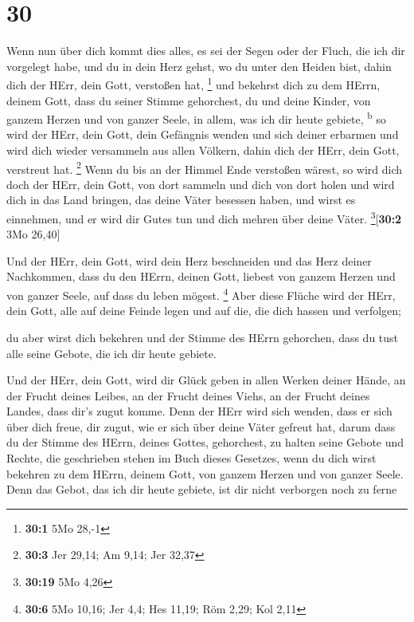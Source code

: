 \hypertarget{section-29}{%
\section{30}\label{section-29}}

 Wenn nun über dich kommt dies alles, es sei der Segen
oder der Fluch, die ich dir vorgelegt habe, und du in dein Herz gehst,
wo du unter den Heiden bist, dahin dich der HErr, dein Gott, verstoßen
hat, \footnote{\textbf{30:1} 5Mo 28,-1}  und bekehrst dich
zu dem HErrn, deinem Gott, dass du seiner Stimme gehorchest, du und
deine Kinder, von ganzem Herzen und von ganzer Seele, in allem, was ich
dir heute gebiete, \textsuperscript{b}  so wird der HErr,
dein Gott, dein Gefängnis wenden und sich deiner erbarmen und wird dich
wieder versammeln aus allen Völkern, dahin dich der HErr, dein Gott,
verstreut hat. \footnote{\textbf{30:3} Jer 29,14; Am 9,14; Jer 32,37}
 Wenn du bis an der Himmel Ende verstoßen wärest, so wird
dich doch der HErr, dein Gott, von dort sammeln und dich von dort holen
 und wird dich in das Land bringen, das deine Väter
besessen haben, und wirst es einnehmen, und er wird dir Gutes tun und
dich mehren über deine Väter. \footnote{\textbf{30:19} 5Mo 4,26}{[}\textbf{30:2}
3Mo 26,40{]}

 Und der HErr, dein Gott, wird dein Herz beschneiden und
das Herz deiner Nachkommen, dass du den HErrn, deinen Gott, liebest von
ganzem Herzen und von ganzer Seele, auf dass du leben mögest.
\footnote{\textbf{30:6} 5Mo 10,16; Jer 4,4; Hes 11,19; Röm 2,29; Kol
  2,11}  Aber diese Flüche wird der HErr, dein Gott, alle
auf deine Feinde legen und auf die, die dich hassen und verfolgen;

 du aber wirst dich bekehren und der Stimme des HErrn
gehorchen, dass du tust alle seine Gebote, die ich dir heute gebiete.

 Und der HErr, dein Gott, wird dir Glück geben in allen
Werken deiner Hände, an der Frucht deines Leibes, an der Frucht deines
Viehs, an der Frucht deines Landes, dass dir's zugut komme. Denn der
HErr wird sich wenden, dass er sich über dich freue, dir zugut, wie er
sich über deine Väter gefreut hat,  darum dass du der
Stimme des HErrn, deines Gottes, gehorchest, zu halten seine Gebote und
Rechte, die geschrieben stehen im Buch dieses Gesetzes, wenn du dich
wirst bekehren zu dem HErrn, deinem Gott, von ganzem Herzen und von
ganzer Seele.  Denn das Gebot, das ich dir heute gebiete,
ist dir nicht verborgen noch zu ferne

